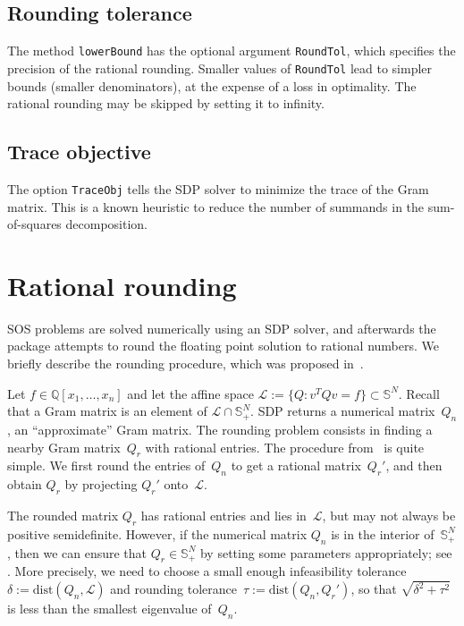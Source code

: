 \documentclass[11pt]{amsart}
\theoremstyle{plain}%
\theoremstyle{definition}
\theoremstyle{remark}
\newcommand{\QQ}{\mathbb{Q}}
\begin{document}
\subsection*{Rounding tolerance}
The method \verb|lowerBound| has the optional argument \verb|RoundTol|, which specifies the precision of the rational rounding.
Smaller values of \verb|RoundTol| lead to simpler bounds (smaller denominators), at the expense of a loss in optimality.
The rational rounding may be skipped by setting it to infinity.

\subsection*{Trace objective}
The option \verb|TraceObj| tells the SDP solver to minimize the trace of the Gram matrix.
This is a known heuristic to reduce the number of summands in the sum-of-squares decomposition.

\appendix

{\color{blue}
\section{Rational rounding}%
\label{sec:rounding}

SOS problems are solved numerically using an SDP solver,
and afterwards the package attempts to round the floating point solution to rational numbers.
We briefly describe the rounding procedure, which was proposed in~\cite{peyrl2008computing}.

Let $f\in \QQ[x_1,\dots,x_n]$ and let the affine space $\mathcal{L}:= \{Q: v^T\! Q v \!=\! f\}\subset \mathbb{S}^N$.
Recall that a Gram matrix is an element of $\mathcal{L}\cap \mathbb{S}_+^N$.
SDP returns a numerical matrix~$Q_n$, an ``approximate'' Gram matrix.
The rounding problem consists in finding a nearby Gram matrix~$Q_r$ with rational entries.
The procedure from~\cite{peyrl2008computing} is quite simple.
We first round the entries of~$Q_n$ to get a rational matrix~$Q_r'$,
and then obtain $Q_r$ by projecting $Q_r'$ onto~$\mathcal{L}$.

The rounded matrix $Q_r$ has rational entries and lies in~$\mathcal{L}$, but may not always be positive semidefinite. 
However, if the numerical matrix $Q_n$ is in the interior of~$\mathbb{S}_+^N$,
then we can ensure that $Q_r\in \mathbb{S}_+^N$ by setting some parameters appropriately;
see \cite[Prop.~8]{peyrl2008computing}.
More precisely, we need to choose a small enough {infeasibility tolerance}~$\delta:= \textrm{dist}(Q_n,\mathcal{L})$
and {rounding tolerance}~$\tau:= \textrm{dist}(Q_n,Q_r')$,
so that $\sqrt{\delta^2 {+} \tau^2}$ is less than the smallest eigenvalue of~$Q_n$.

}
\end{document}
